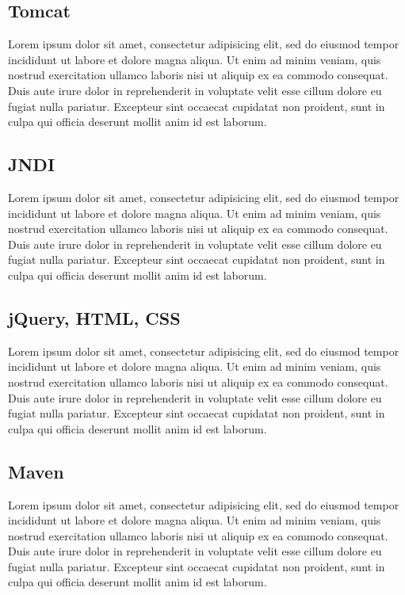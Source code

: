 \documentclass{article}
\begin{document}
\subsection{Tomcat} %
\label{sub:tomcat}
Lorem ipsum dolor sit amet, consectetur adipisicing elit, sed do eiusmod tempor incididunt ut labore et dolore magna aliqua. Ut enim ad minim veniam, quis nostrud exercitation ullamco laboris nisi ut aliquip ex ea commodo consequat. Duis aute irure dolor in reprehenderit in voluptate velit esse cillum dolore eu fugiat nulla pariatur. Excepteur sint occaecat cupidatat non proident, sunt in culpa qui officia deserunt mollit anim id est laborum.

\subsection{JNDI} %
\label{sub:jndi}
Lorem ipsum dolor sit amet, consectetur adipisicing elit, sed do eiusmod tempor incididunt ut labore et dolore magna aliqua. Ut enim ad minim veniam, quis nostrud exercitation ullamco laboris nisi ut aliquip ex ea commodo consequat. Duis aute irure dolor in reprehenderit in voluptate velit esse cillum dolore eu fugiat nulla pariatur. Excepteur sint occaecat cupidatat non proident, sunt in culpa qui officia deserunt mollit anim id est laborum.

\subsection{jQuery, HTML, CSS} %
\label{sub:jquery}
Lorem ipsum dolor sit amet, consectetur adipisicing elit, sed do eiusmod tempor incididunt ut labore et dolore magna aliqua. Ut enim ad minim veniam, quis nostrud exercitation ullamco laboris nisi ut aliquip ex ea commodo consequat. Duis aute irure dolor in reprehenderit in voluptate velit esse cillum dolore eu fugiat nulla pariatur. Excepteur sint occaecat cupidatat non proident, sunt in culpa qui officia deserunt mollit anim id est laborum.

\subsection{Maven} %
\label{sub:maven}
Lorem ipsum dolor sit amet, consectetur adipisicing elit, sed do eiusmod tempor incididunt ut labore et dolore magna aliqua. Ut enim ad minim veniam, quis nostrud exercitation ullamco laboris nisi ut aliquip ex ea commodo consequat. Duis aute irure dolor in reprehenderit in voluptate velit esse cillum dolore eu fugiat nulla pariatur. Excepteur sint occaecat cupidatat non proident, sunt in culpa qui officia deserunt mollit anim id est laborum.
\end{document}
